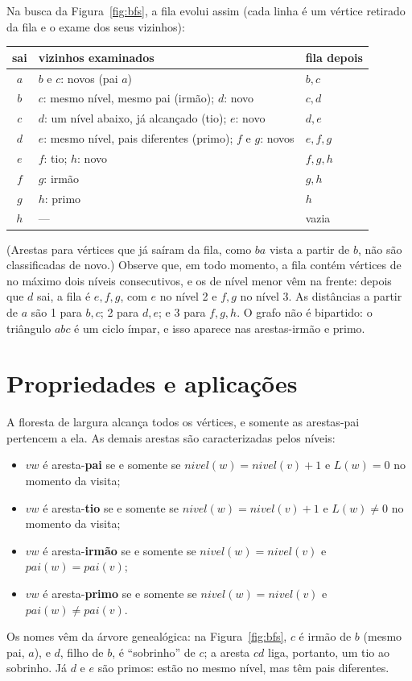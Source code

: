 \begin{exemplo}\label{ex:bfsfila}
Na busca da Figura~\ref{fig:bfs}, a fila evolui assim (cada linha é um vértice retirado da fila e o exame dos seus vizinhos):
\begin{center}\small
\begin{tabular}{@{}cll@{}}
\toprule
sai & vizinhos examinados & fila depois\\
\midrule
$a$ & $b$ e $c$: novos (pai $a$) & $b,c$\\
$b$ & $c$: mesmo nível, mesmo pai (irmão); $d$: novo & $c,d$\\
$c$ & $d$: um nível abaixo, já alcançado (tio); $e$: novo & $d,e$\\
$d$ & $e$: mesmo nível, pais diferentes (primo); $f$ e $g$: novos & $e,f,g$\\
$e$ & $f$: tio; $h$: novo & $f,g,h$\\
$f$ & $g$: irmão & $g,h$\\
$g$ & $h$: primo & $h$\\
$h$ & --- & vazia\\
\bottomrule
\end{tabular}
\end{center}
(Arestas para vértices que já saíram da fila, como $ba$ vista a partir de $b$, não são classificadas de novo.) Observe que, em todo momento, a fila contém vértices de no máximo dois níveis consecutivos, e os de nível menor vêm na frente: depois que $d$ sai, a fila é $e,f,g$, com $e$ no nível 2 e $f,g$ no nível 3. As distâncias a partir de $a$ são 1 para $b,c$; 2 para $d,e$; e 3 para $f,g,h$. O grafo não é bipartido: o triângulo $abc$ é um ciclo ímpar, e isso aparece nas arestas-irmão e primo.
\end{exemplo}

\section{Propriedades e aplicações}\label{sec:bfsprop}
A floresta de largura alcança todos os vértices, e somente as arestas-pai pertencem a ela. As demais arestas são caracterizadas pelos níveis:
\begin{itemize}
  \item $vw$ é aresta-\textbf{pai} se e somente se $nivel(w)=nivel(v)+1$ e $L(w)=0$ no momento da visita;
  \item $vw$ é aresta-\textbf{tio} se e somente se $nivel(w)=nivel(v)+1$ e $L(w)\ne0$ no momento da visita;
  \item $vw$ é aresta-\textbf{irmão} se e somente se $nivel(w)=nivel(v)$ e $pai(w)=pai(v)$;
  \item $vw$ é aresta-\textbf{primo} se e somente se $nivel(w)=nivel(v)$ e $pai(w)\ne pai(v)$.
\end{itemize}
Os nomes vêm da árvore genealógica: na Figura~\ref{fig:bfs}, $c$ é irmão de $b$ (mesmo pai, $a$), e $d$, filho de $b$, é ``sobrinho'' de $c$; a aresta $cd$ liga, portanto, um tio ao sobrinho. Já $d$ e $e$ são primos: estão no mesmo nível, mas têm pais diferentes.

